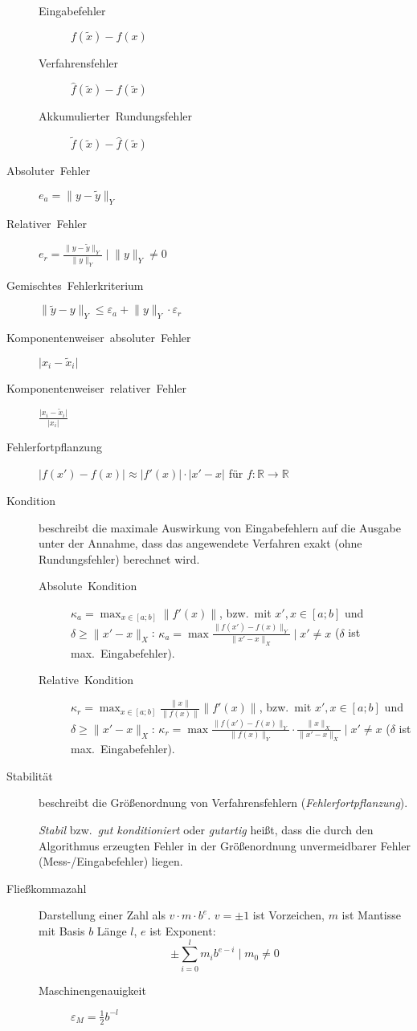 \begin{description}
  \begin{description}
    \item [{Eingabefehler}]
	  $f(\tilde{x})-f(x)$
    \item [{Verfahrensfehler}]
	  $\hat{f}(\tilde{x})-f(\tilde{x})$
    \item [{Akkumulierter~Rundungsfehler}]
	  $\tilde{f}(\tilde{x})-\hat{f}(\tilde{x})$
  \end{description}
  \item [{Absoluter~Fehler}]
	$e_a = \lVert y-\tilde{y} \rVert_Y$
  \item [{Relativer~Fehler}]
	$e_r = \frac{\lVert y-\tilde y \rVert_Y}{\lVert y \rVert_Y} \mid \lVert y \rVert_Y \neq 0$
  \item [{Gemischtes~Fehlerkriterium}]
	$\lVert \tilde y - y \rVert_Y \leq \varepsilon_a + \lVert y \rVert_{Y} \cdot \varepsilon_r$
  \item [{Komponentenweiser~absoluter~Fehler}]
	$\lvert x_i - \tilde x_i \rvert$
  \item [{Komponentenweiser~relativer~Fehler}]
	$\frac{\lvert x_i - \tilde x_i \rvert}{\lvert x_i \rvert}$
  \item [{Fehlerfortpflanzung}]
	$\lvert f(x') - f(x) \rvert \approx \lvert f'(x) \rvert \cdot \lvert x'-x \rvert$ für $f:\mathbb{R}\to\mathbb{R}$
  \item [{Kondition}]
	beschreibt die maximale Auswirkung von Eingabefehlern auf die Ausgabe unter der Annahme, dass das angewendete Verfahren exakt (ohne Rundungsfehler) berechnet wird.
	\begin{description}
	  \item [{Absolute~Kondition}] $\kappa_a = \max_{x\in[a;b]} \lVert f'(x) \rVert$, bzw.~mit $x',x\in[a;b]$ und $\delta\geq\lVert x'-x \rVert_X$: $\kappa_a = \max\frac{\lVert f(x')-f(x)\rVert_Y}{\lVert x'-x \rVert_X} \mid x'\neq x$ ($\delta$ ist max.~Eingabefehler).
	  \item [{Relative~Kondition}] $\kappa_r = \max_{x\in[a;b]}\frac{\lVert x \rVert}{\lVert f(x) \rVert}\lVert f'(x) \rVert$, bzw.~mit $x',x\in[a;b]$ und $\delta\geq\lVert x'-x \rVert_X$: $\kappa_{r}=\max\frac{\lVert f(x')-f(x)\rVert_Y}{\lVert f(x)\rVert_Y}\cdot\frac{\lVert x \rVert_X}{\lVert x'-x \rVert_X}\mid x'\neq x$ ($\delta$ ist max.~Eingabefehler).
	\end{description}
  \item [{Stabilität}]
	beschreibt die Größenordnung von Verfahrensfehlern (\emph{Fehlerfortpflanzung}).

	\emph{Stabil} bzw.~\emph{gut konditioniert} oder \emph{gutartig} heißt, dass die durch den Algorithmus erzeugten Fehler in der Größenordnung unvermeidbarer Fehler (Mess-/Eingabefehler) liegen.
  \item [{Fließkommazahl}]
	Darstellung einer Zahl als $v\cdot m\cdot b^e$. $v=\pm1$ ist Vorzeichen, $m$ ist Mantisse mit Basis $b$ Länge $l$, $e$ ist Exponent:
	\[ \pm\sum_{i=0}^l m_i b^{e-i} \mid m_0 \neq 0 \]
	\begin{description}
	  \item [{Maschinengenauigkeit}]
		$\varepsilon_{M}=\frac{1}{2}b^{-l}$
	\end{description}


\end{description}

